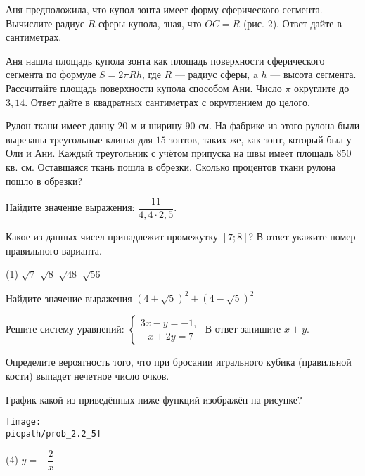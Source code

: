 \begin{training}[2]
\begin{listofex}
		\newpage
		\hphantom{Часть 1}
		\item Аня предположила, что купол зонта имеет форму сферического сегмента. Вычислите радиус \( R \) сферы купола, зная, что \( OC=R \) (рис. \( 2 \)). Ответ дайте в сантиметрах.
		\foranswer
		\item Аня нашла площадь купола зонта как площадь поверхности сферического сегмента по формуле \( S=2\pi Rh \), где \( R \) --- радиус сферы, a \( h \) --- высота сегмента. Рассчитайте площадь поверхности купола способом Ани. Число \( \pi \)  округлите до \( 3,14 \). Ответ дайте в квадратных сантиметрах с округлением до целого.
		\foranswer
		\item Рулон ткани имеет длину \( 20 \) м и ширину \( 90 \) см. На фабрике из этого рулона были вырезаны треугольные клинья для \( 15 \) зонтов, таких же, как зонт, который был у Оли и Ани. Каждый треугольник с учётом припуска на швы имеет площадь \( 850 \) кв. см. Оставшаяся ткань пошла в обрезки. Сколько процентов ткани рулона пошло в обрезки?
		\foranswer
		\item Найдите значение выражения: \( \dfrac{11}{4,4\cdot2,5} \).
		\foranswer
		\item Какое из данных чисел принадлежит промежутку \( [7;8] \)? В ответ укажите номер правильного варианта.
		\begin{tasks}(1)
			\task \( \sqrt{7} \)
			\task \( \sqrt{8} \)
			\task \( \sqrt{48} \)
			\task \( \sqrt{56} \)
		\end{tasks}
		\foranswer
		\item Найдите значение выражения \( (4+\sqrt{5})^2+(4-\sqrt{5})^2 \)
		\foranswer
		\newpage
		\item Решите систему уравнений: \( \left\{
		\begin{array}{l}
			3x-y=-1,\\
			-x+2y=7
		\end{array}
		\right. \) В ответ запишите \( x+y \).
		\foranswer
		\item Определите вероятность того, что при бросании игрального кубика (правильной кости) выпадет нечетное число очков.
		\foranswer
		\item График какой из приведённых ниже функций изображён на рисунке?
		\begin{center}
			\texttt{[image: \\picpath/prob\_2.2\_5]}
		\end{center}
		\begin{tasks}(4)
			\task \( y=-\dfrac{2}{x} \)

\end{tasks}
\end{listofex}
\end{training}
